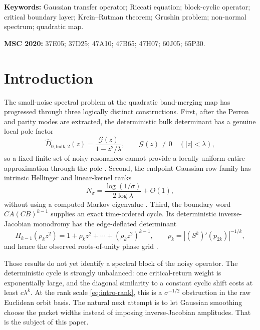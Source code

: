 \documentclass[11pt]{article}
\theoremstyle{definition}
\theoremstyle{remark}
\begin{document}
\noindent\textbf{Keywords:} Gaussian transfer operator; Riccati equation;
block-cyclic operator; critical boundary layer; Krein--Rutman theorem;
Grushin problem; non-normal spectrum; quadratic map.

\medskip
\noindent\textbf{MSC 2020:} 37E05; 37D25; 47A10; 47B65; 47H07; 60J05;
65P30.

\section{Introduction}
\label{sec:introduction}

The small-noise spectral problem at the quadratic band-merging map has
progressed through three logically distinct constructions.  First, after
the Perron and parity modes are extracted, the deterministic bulk determinant
has a genuine local pole factor
\begin{equation}\label{eq:intro-pole}
 \widehat D_{0,\mathrm{bulk},2}(z)
 =\frac{\mathcal G(z)}{1-z^2/\lambda},
 \qquad \mathcal G(z)\ne0\quad (|z|<\lambda),
\end{equation}
so a fixed finite set of noisy resonances cannot provide a locally uniform
entire approximation through the pole
\citep{WangBoundaryLayer2026,WangBulkScattering2026}.  Second, the endpoint
Gaussian row family has intrinsic Hellinger and linear-kernel ranks
\begin{equation}\label{eq:intro-rank}
 N_\sigma=\frac{\log(1/\sigma)}{2\log\lambda}+O(1),
\end{equation}
without using a computed Markov eigenvalue
\citep{WangEndpointRank2026}.  Third, the boundary word
$CA(CB)^{k-1}$ supplies an exact time-ordered cycle.  Its deterministic
inverse-Jacobian monodromy has the edge-deflated determinant
\begin{equation}\label{eq:intro-geometric}
 \Pi_{k-1}(\rho_kz^2)
 =1+\rho_kz^2+\cdots+(\rho_kz^2)^{k-1},
 \qquad
 \rho_k=|(S^k)'(p_{2k})|^{-1/k},
\end{equation}
and hence the observed roots-of-unity phase grid
\citep{WangTimeOrdered2026}.

Those results do not yet identify a spectral block of the noisy operator.
The deterministic cycle is strongly unbalanced: one critical-return weight
is exponentially large, and the diagonal similarity to a constant cyclic
shift costs at least $c\lambda^k$.  At the rank scale
\eqref{eq:intro-rank}, this is a $\sigma^{-1/2}$ obstruction in the raw
Euclidean orbit basis.  The natural next attempt is to let Gaussian smoothing
choose the packet widths instead of imposing inverse-Jacobian amplitudes.
That is the subject of this paper.
\end{document}
